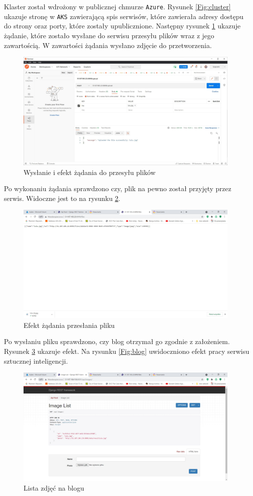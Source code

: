 \documentclass[12pt,twoside]{article}
\begin{document}
Klaster został wdrożony w publicznej chmurze \texttt{Azure}. Rysunek \ref{Fig:cluster} ukazuje stronę w \texttt{AKS} zawierającą spis serwisów, które zawierała adresy dostępu do strony oraz porty, które zostały upublicznione.
Następny rysunek \ref{Fig:send} ukazuje żądanie, które zostało wysłane do serwisu przesyłu plików wraz z jego zawartością. W zawartości żądania wysłano zdjęcie do przetworzenia.
\begin{figure}[ht]
	\centering
	\includegraphics[width=11cm]{figures/send.jpg}
	\caption{Wysłanie i efekt żądania do przesyłu plików}
\label{Fig:send}
\end{figure}

Po wykonaniu żądania sprawdzono czy, plik na pewno został przyjęty przez serwis. Widoczne jest to na rysunku \ref{Fig:download}.
\begin{figure}[ht]
	\centering
	\includegraphics[width=11cm]{figures/download.jpg}
	\caption{Efekt żądania przesłania pliku}
\label{Fig:download}
\end{figure}

Po wysłaniu pliku sprawdzono, czy blog otrzymał go zgodnie z założeniem. Rysunek \ref{Fig:blog1} ukazuje efekt. Na rysunku \ref{Fig:blog} uwidoczniono efekt pracy serwisu sztucznej inteligencji.
\begin{figure}[ht]
	\centering
	\includegraphics[width=11cm]{figures/blog1.jpg}
	\caption{Lista zdjęć na blogu}
\label{Fig:blog1}
\end{figure}
\end{document}
